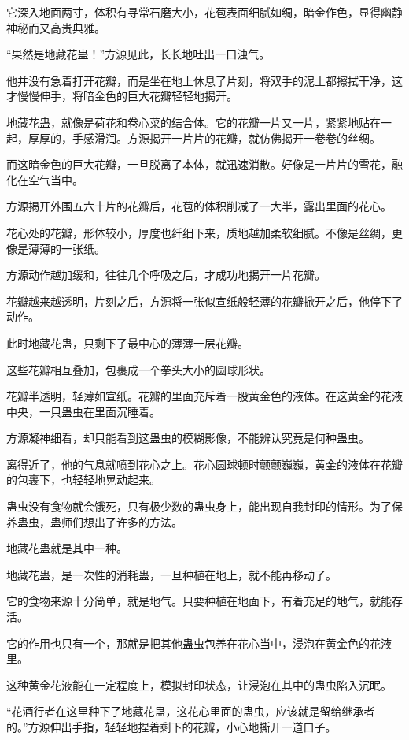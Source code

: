 \begin{this_body}
它深入地面两寸，体积有寻常石磨大小，花苞表面细腻如绸，暗金作色，显得幽静神秘而又高贵典雅。

“果然是地藏花蛊！”方源见此，长长地吐出一口浊气。

他并没有急着打开花瓣，而是坐在地上休息了片刻，将双手的泥土都擦拭干净，这才慢慢伸手，将暗金色的巨大花瓣轻轻地揭开。

地藏花蛊，就像是荷花和卷心菜的结合体。它的花瓣一片又一片，紧紧地贴在一起，厚厚的，手感滑润。方源揭开一片片的花瓣，就仿佛揭开一卷卷的丝绸。

而这暗金色的巨大花瓣，一旦脱离了本体，就迅速消散。好像是一片片的雪花，融化在空气当中。

方源揭开外围五六十片的花瓣后，花苞的体积削减了一大半，露出里面的花心。

花心处的花瓣，形体较小，厚度也纤细下来，质地越加柔软细腻。不像是丝绸，更像是薄薄的一张纸。

方源动作越加缓和，往往几个呼吸之后，才成功地揭开一片花瓣。

花瓣越来越透明，片刻之后，方源将一张似宣纸般轻薄的花瓣掀开之后，他停下了动作。

此时地藏花蛊，只剩下了最中心的薄薄一层花瓣。

这些花瓣相互叠加，包裹成一个拳头大小的圆球形状。

花瓣半透明，轻薄如宣纸。花瓣的里面充斥着一股黄金色的液体。在这黄金的花液中央，一只蛊虫在里面沉睡着。

方源凝神细看，却只能看到这蛊虫的模糊影像，不能辨认究竟是何种蛊虫。

离得近了，他的气息就喷到花心之上。花心圆球顿时颤颤巍巍，黄金的液体在花瓣的包裹下，也轻轻地晃动起来。

蛊虫没有食物就会饿死，只有极少数的蛊虫身上，能出现自我封印的情形。为了保养蛊虫，蛊师们想出了许多的方法。

地藏花蛊就是其中一种。

地藏花蛊，是一次性的消耗蛊，一旦种植在地上，就不能再移动了。

它的食物来源十分简单，就是地气。只要种植在地面下，有着充足的地气，就能存活。

它的作用也只有一个，那就是把其他蛊虫包养在花心当中，浸泡在黄金色的花液里。

这种黄金花液能在一定程度上，模拟封印状态，让浸泡在其中的蛊虫陷入沉眠。

“花酒行者在这里种下了地藏花蛊，这花心里面的蛊虫，应该就是留给继承者的。”方源伸出手指，轻轻地捏着剩下的花瓣，小心地撕开一道口子。


\end{this_body}
